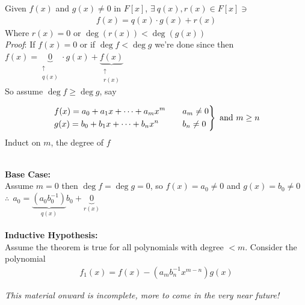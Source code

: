 \setcounter{dummy_lemma}{1}
\begin{lemma}
Given $f(x)$ and $g(x)\neq 0$ in $F[x]$, $\exists \ q(x), r(x) \in F[x] \ni $
\begin{align}
    f(x) = q(x)\cdot g(x) + r(x) \nonumber
\end{align}
Where $r(x)=0$ or $\deg(r(x)) < \deg(g(x))$ \\ \steezybreak
\textit{Proof}: If $f(x)=0$ or if $\deg f < \deg g$ we're done since then $f(x)=\underbrace{0}_{\substack{\uparrow \\ q(x)}}\cdot g(x)+\underbrace{f(x)}_{\substack{\uparrow \\ r(x)}}$ \\
So assume $\deg f \geq \deg g$, say

\begin{align}
    \begin{drcases}
        f(x) = a_0 + a_1 x+ \cdots + a_m x^m \ \ \ &a_m \neq 0 \nonumber \\
        g(x) = b_0 + b_1 x+ \cdots + b_n x^n \ \ \ &b_n \neq 0 \nonumber 
    \end{drcases} \text{ and }m\geq n
\end{align}
Induct on $m$, the degree of $f$ \\ \steezybreak

\noindent \\ \steezybreak
\textbf{Base Case:} \\  \steezybreak 
Assume $m=0$ then $\deg f=\deg g = 0$, so $f(x) = a_0 \neq 0$ and $g(x)=b_0\neq 0$ \\
\noindent $\therefore \ \ a_0 = \underbrace{(a_0 b_0^{-1})}_{q(x)}b_0 + \underbrace{0}_{r(x)}$ \\ \steezybreak
\\ \steezybreak
\noindent \textbf{Inductive Hypothesis:} \\ \steezybreak
\noindent Assume the theorem is true for all polynomials with degree $< m$. Consider the polynomial
\begin{align}
    f_1(x) = f(x) - (a_m b_n^{-1}x^{m-n})g(x) \nonumber
\end{align}
\end{lemma}
\steezybreak \textit{This material onward is incomplete, more to come in the very near future!}

